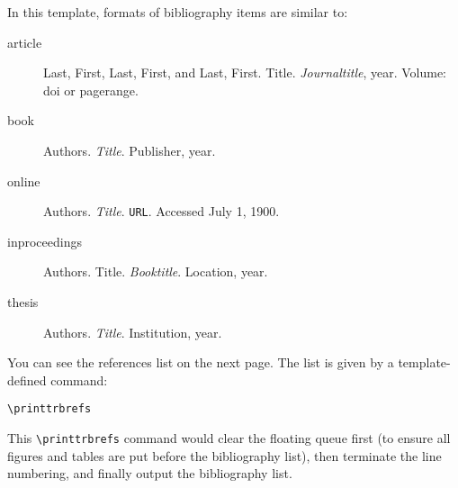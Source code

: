 \documentclass[12pt]{trbart}
\begin{document}
In this template, formats of bibliography items are similar to:
\begin{description}
    \item[article] Last, First, Last, First, and Last, First. Title. \textit{Journaltitle}, year. Volume: doi or pagerange.
    \item[book] Authors. \textit{Title}. Publisher, year.
    \item[online] Authors. \textit{Title}. \texttt{URL}. Accessed July 1, 1900.
    \item[inproceedings] Authors. Title. \textit{Booktitle}. Location, year.
    \item[thesis] Authors. \textit{Title}. Institution, year. 
\end{description} 

You can see the references list on the next page. The list is given by a template-defined command:
\begin{verbatim}
\printtrbrefs
\end{verbatim}

This \verb+\printtrbrefs+ command would clear the floating queue first (to ensure all figures and tables are put before the bibliography list), then terminate the line numbering, and finally output the bibliography list.

\printtrbrefs%
\end{document}

